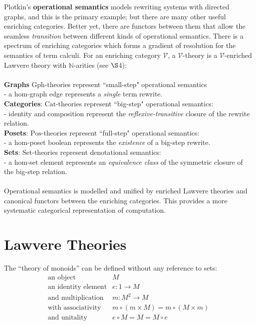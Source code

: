 \documentclass[a4paper,UKenglish]{article}
\theoremstyle{definition}
\newcommand{\Gph}{\mathrm{Gph}}
\newcommand{\Set}{\mathrm{Set}}
\newcommand{\Cat}{\mathrm{Cat}}
\newcommand{\Pos}{\mathrm{Pos}}
\newcommand{\NN}{\mathbb{N}}
\newcommand{\V}{\mathscr{V}}
\begin{document}
Plotkin's \textbf{operational semantics} \cite{sos} models rewriting systems with directed graphs, and this is the primary example; but there are many other useful enriching categories. Better yet, there are functors between them that allow the seamless \textit{transition} between different kinds of operational semantics. There is a spectrum of enriching categories which forms a gradient of resolution for the semantics of term calculi. For an enriching category $\V$, a $\V$-theory is a $\V$-enriched Lawvere theory with $\NN$-arities (see $\S$4):\\\\
\textbf{Graphs} $\Gph$-theories represent ``small-step" operational semantics\\ - a hom-graph edge represents a \textit{single} term rewrite.\\
\textbf{Categories}: $\Cat$-theories represent ``big-step" operational semantics:\\ - identity and composition represent the \textit{reflexive-transitive} closure of the rewrite relation.\\
\textbf{Posets}: $\Pos$-theories represent ``full-step" operational semantics:\\ - a hom-poset boolean represents the \textit{existence} of a big-step rewrite.\\
\textbf{Sets}: $\Set$-theories represent denotational semantics:\\ - a hom-set element represents an \textit{equivalence class} of the symmetric closure of the big-step relation.\\\\
Operational semantics is modelled and unified by enriched Lawvere theories and canonical functors between the enriching categories. This provides a more systematic categorical representation of computation.

\section{Lawvere Theories}
The ``theory of monoids'' can be defined without any reference to sets:
\[\begin{array}{rl}
\text{an object} & M\\
\text{an identity element} & e:1 \to M\\
\text{and multiplication} & m: M^2 \to M\\
\text{with associativity} & m \circ (m \times M) = m \circ (M \times m)\\
\text{and unitality} & e \circ M = M = M \circ e\\
\end{array}\]
\end{document}
